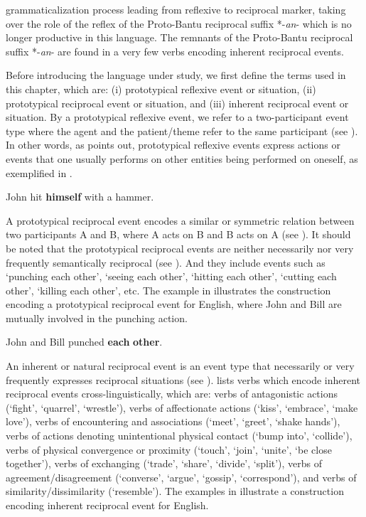 \documentclass[output=paper,
            colorlinks, citecolor=brown
            ,draftmode
		  ]{langscibook}
\begin{document}
grammaticalization process leading from reflexive to reciprocal marker, taking over the role of the reflex of the Proto-Bantu reciprocal suffix *-\textit{an}{}- which is no longer productive in this language. The remnants of the Proto-Bantu reciprocal suffix *-\textit{an}{}- are found in a very few verbs encoding inherent reciprocal events. 

Before introducing the language under study, we first define the terms used in this chapter, which are: (i) prototypical reflexive event or situation, (ii) prototypical reciprocal event or situation, and (iii) inherent reciprocal event or situation. By a prototypical reflexive event, we refer to a two-participant event type where the agent and the patient/theme refer to the same participant (see \citealt{Faltz1985, Haspelmath2019, Kemmer1993}). In other words, as \citet[107]{Moyse-Faurie2008} points out, prototypical reflexive events express actions or events that one usually performs on other entities being performed on oneself, as exemplified in . 

\ea\label{ex:ngwasi:1}
John hit \textbf{himself} with a hammer.
\z

A prototypical reciprocal event encodes a similar or symmetric relation between two participants A and B, where A acts on B and B acts on A (see \citealt{Haspelmath2007, Kemmer1993, KönigKokutani2006}). It should be noted that the prototypical reciprocal events are neither necessarily nor very frequently semantically reciprocal (see \citealt{DomEtAlForthcoming, Haiman1983}). And they include events such as ‘punching each other’, ‘seeing each other’, ‘hitting each other’, ‘cutting each other’, ‘killing each other’, etc. The example in  illustrates the construction encoding a prototypical reciprocal event for English, where John and Bill are mutually involved in the punching action.

\ea\label{ex:ngwasi:2}
John and Bill punched \textbf{each} \textbf{other}.
\z

An inherent or natural reciprocal event is an event type that necessarily or very frequently expresses reciprocal situations (see \citealt{Kemmer1993, KönigKokutani2006, Nedjalkov2007}). \citet[104]{Kemmer1993} lists verbs which encode inherent reciprocal events cross-linguistically, which are: verbs of antagonistic actions (‘fight’, ‘quarrel’, ‘wrestle’), verbs of affectionate actions (‘kiss’, ‘embrace’, ‘make love’), verbs of encountering and associations (‘meet’, ‘greet’, ‘shake hands’), verbs of actions denoting unintentional physical contact (‘bump into’, ‘collide’), verbs of physical convergence or proximity (‘touch’, ‘join’, ‘unite’, ‘be close together’), verbs of exchanging (‘trade’, ‘share’, ‘divide’, ‘split’), verbs of agreement/disagreement  (‘converse’, ‘argue’, ‘gossip’, ‘correspond’), and verbs of similarity/dissimilarity (‘resemble’). The examples in  illustrate a construction encoding inherent reciprocal event for English.
\end{document}
